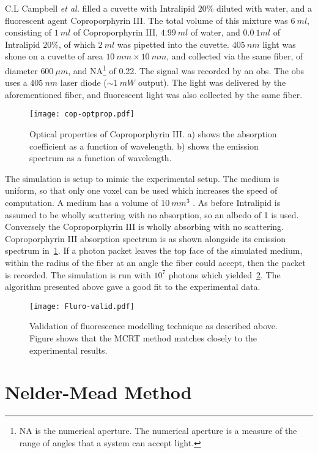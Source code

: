 C.L Campbell \textit{et al.} filled a cuvette with Intralipid $20\%$ diluted with water, and a fluorescent agent Coproporphyrin III\@.
The total volume of this mixture was $6~ml$, consisting of $1~ml$ of Coproporphyrin III, $4.99~ml$ of water, and $0.0~1ml$ of Intralipid $20\%$, of which $2~ml$ was pipetted into the cuvette.
$405~nm$ light was shone on a cuvette of area $10~mm \times 10~mm$, and collected via the same fiber, of diameter $600~\mu m$, and NA\footnote{NA is the numerical aperture. The numerical aperture is a measure of the range of angles that a system can accept light.} of 0.22.
The signal was recorded by an \gls*{obs}.
The \gls*{obs} uses a $405~nm$ laser diode ($\sim1~mW$ output).
The light was delivered by the aforementioned fiber, and fluorescent light was also collected by the same fiber.


\begin{figure}[!htpb]
	\centering
	\texttt{[image: cop-optprop.pdf]}
	\caption{Optical properties of Coproporphyrin III. a) shows the absorption coefficient as a function of wavelength. b) shows the emission spectrum as a function of wavelength.}
	\label{fig:coporiii}
\end{figure}

The simulation is setup to mimic the experimental setup.
The medium is uniform, so that only one voxel can be used which increases the speed of computation.
A medium has a volume of $10~mm^3$ .
As before Intralipid is assumed to be wholly scattering with no absorption, so an albedo of 1 is used.
Conversely the Coproporphyrin III is wholly absorbing with no scattering.
Coproporphyrin III absorption spectrum is as shown alongside its emission spectrum in~\cref{fig:coporiii}.
If a photon packet leaves the top face of the simulated medium, within the radius of the fiber at an angle the fiber could accept, then the packet is recorded.
The simulation is run with $10^7$ photons which yielded~\cref{fig:flurovalid}.
The algorithm presented above gave a good fit to the experimental data.

\begin{figure}[!htpb]
  \centering
  \texttt{[image: Fluro-valid.pdf]}
  \caption{Validation of fluorescence modelling technique as described above. Figure shows that the MCRT method matches closely to the experimental results.}
  \label{fig:flurovalid}
\end{figure}

\FloatBarrier

\section{Nelder-Mead Method}

